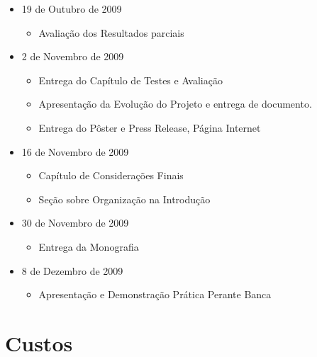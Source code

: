 \documentclass[]{article}
\begin{document}
\begin{itemize}
  \item 19 de Outubro de 2009
  \begin{itemize}
    \item Avaliação dos Resultados parciais
  \end{itemize}
  
  \item 2 de Novembro de 2009
  \begin{itemize}
    \item Entrega do Capítulo de Testes e Avaliação
    \item Apresentação da Evolução do Projeto e entrega de documento.
    \item Entrega do Pôster e Press Release, Página Internet
  \end{itemize}
  
  \item 16 de Novembro de 2009
  \begin{itemize}
    \item Capítulo de Considerações Finais
    \item Seção sobre Organização na Introdução
  \end{itemize}
  
  \item 30 de Novembro de 2009
  \begin{itemize}
    \item Entrega da Monografia
  \end{itemize}
  
  \item 8 de Dezembro de 2009
  \begin{itemize}
    \item Apresentação e Demonstração Prática Perante Banca
  \end{itemize}
\end{itemize}



\section{Custos} %
\label{sec:custos}
\end{document}
